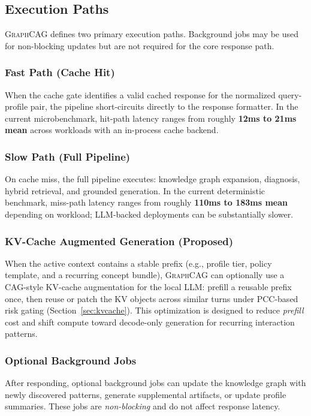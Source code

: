 \documentclass[11pt,a4paper,twocolumn]{article}
\newcommand{\graphcag}{\textsc{GraphCAG}}
\begin{document}
\subsection{Execution Paths}

\graphcag{} defines two primary execution paths. Background jobs may be used for non-blocking updates but are not required for the core response path.

\subsubsection{Fast Path (Cache Hit)}
When the cache gate identifies a valid cached response for the normalized query-profile pair, the pipeline short-circuits directly to the response formatter. In the current microbenchmark, hit-path latency ranges from roughly \textbf{12ms to 21ms mean} across workloads with an in-process cache backend.

\subsubsection{Slow Path (Full Pipeline)}
On cache miss, the full pipeline executes: knowledge graph expansion, diagnosis, hybrid retrieval, and grounded generation. In the current deterministic benchmark, miss-path latency ranges from roughly \textbf{110ms to 183ms mean} depending on workload; LLM-backed deployments can be substantially slower.

\subsubsection{KV-Cache Augmented Generation (Proposed)}
When the active context contains a stable prefix (e.g., profile tier, policy template, and a recurring concept bundle), \graphcag{} can optionally use a CAG-style KV-cache augmentation for the local LLM: prefill a reusable prefix once, then reuse or patch the KV objects across similar turns under PCC-based risk gating (Section~\ref{sec:kvcache}). This optimization is designed to reduce \emph{prefill} cost and shift compute toward decode-only generation for recurring interaction patterns.

\subsubsection{Optional Background Jobs}
After responding, optional background jobs can update the knowledge graph with newly discovered patterns, generate supplemental artifacts, or update profile summaries. These jobs are \emph{non-blocking} and do not affect response latency.
\end{document}

